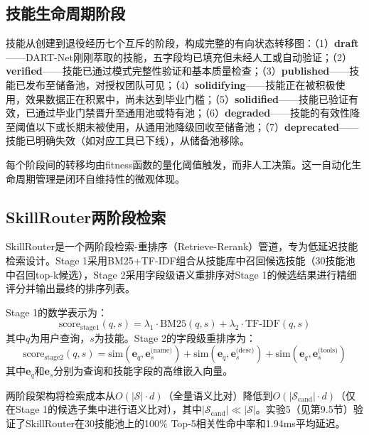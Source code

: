 \documentclass[12pt,a4paper]{ctexart}
\begin{document}
\subsection{技能生命周期阶段}

技能从创建到退役经历七个互斥的阶段，构成完整的有向状态转移图：（1）\textbf{draft}——DART-Net刚刚萃取的技能，五字段均已填充但未经人工或自动验证；（2）\textbf{verified}——技能已通过模式完整性验证和基本质量检查；（3）\textbf{published}——技能已发布至储备池，对授权团队可见；（4）\textbf{solidifying}——技能正在被积极使用，效果数据正在积累中，尚未达到毕业门槛；（5）\textbf{solidified}——技能已验证有效，已通过毕业门禁晋升至通用池或特有池；（6）\textbf{degraded}——技能的有效性降至阈值以下或长期未被使用，从通用池降级回收至储备池；（7）\textbf{deprecated}——技能已明确失效（如对应工具已下线），从储备池移除。

每个阶段间的转移均由fitness函数的量化阈值触发，而非人工决策。这一自动化生命周期管理是闭环自维持性的微观体现。

\subsection{SkillRouter两阶段检索}

SkillRouter是一个两阶段检索-重排序（Retrieve-Rerank）管道，专为低延迟技能检索设计。Stage 1采用BM25+TF-IDF组合从技能库中召回候选技能（30技能池中召回top-k候选），Stage 2采用字段级语义重排序对Stage 1的候选结果进行精细评分并输出最终的排序列表。

Stage 1的数学表示为：
\begin{equation}
\text{score}_{\text{stage1}}(q, s) = \lambda_1 \cdot \text{BM25}(q, s) + \lambda_2 \cdot \text{TF-IDF}(q, s)
\label{eq:stage1}
\end{equation}
其中$q$为用户查询，$s$为技能。Stage 2的字段级重排序为：
\begin{equation}
\text{score}_{\text{stage2}}(q, s) = \text{sim}(\mathbf{e}_q, \mathbf{e}_s^{\text{(name)}}) + \text{sim}(\mathbf{e}_q, \mathbf{e}_s^{\text{(desc)}}) + \text{sim}(\mathbf{e}_q, \mathbf{e}_s^{\text{(tools)}})
\label{eq:stage2}
\end{equation}
其中$\mathbf{e}_q$和$\mathbf{e}_s$分别为查询和技能字段的高维嵌入向量。

两阶段架构将检索成本从$O(|\mathcal{S}| \cdot d)$（全量语义比对）降低到$O(|\mathcal{S}_{\text{cand}}| \cdot d)$（仅在Stage 1的候选子集中进行语义比对），其中$|\mathcal{S}_{\text{cand}}| \ll |\mathcal{S}|$。实验5（见第9.5节）验证了SkillRouter在30技能池上的100\% Top-5相关性命中率和1.94ms平均延迟。
\end{document}
